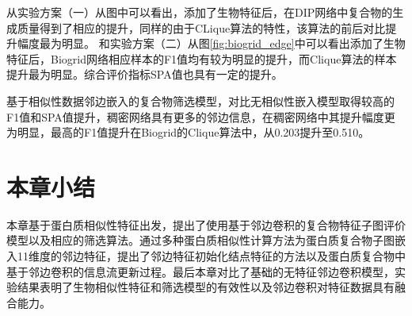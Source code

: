 从实验方案（一）从图中可以看出，添加了生物特征后，在DIP网络中复合物的生成质量得到了相应的提升，同样的由于CLique算法的特性，该算法的前后对比提升幅度最为明显。
和实验方案（二）从图\ref{fig:biogrid_edge}中可以看出添加了生物特征后，Biogrid网络相应样本的F1值均有较为明显的提升，而Clique算法的样本提升最为明显。综合评价指标SPA值也具有一定的提升。

基于相似性数据邻边嵌入的复合物筛选模型，对比无相似性嵌入模型取得较高的F1值和SPA值提升，稠密网络具有更多的邻边信息，在稠密网络中其提升幅度更为明显，最高的F1值提升在Biogrid的Clique算法中，从0.203提升至0.510。


\section{本章小结}
\label{section:EdgeConv:summary}

本章基于蛋白质相似性特征出发，提出了使用基于邻边卷积的复合物特征子图评价模型以及相应的筛选算法。通过多种蛋白质相似性计算方法为蛋白质复合物子图嵌入11维度的邻边特征，提出了邻边特征初始化结点特征的方法以及蛋白质复合物中基于邻边卷积的信息流更新过程。最后本章对比了基础的无特征邻边卷积模型，实验结果表明了生物相似性特征和筛选模型的有效性以及邻边卷积对特征数据具有融合能力。